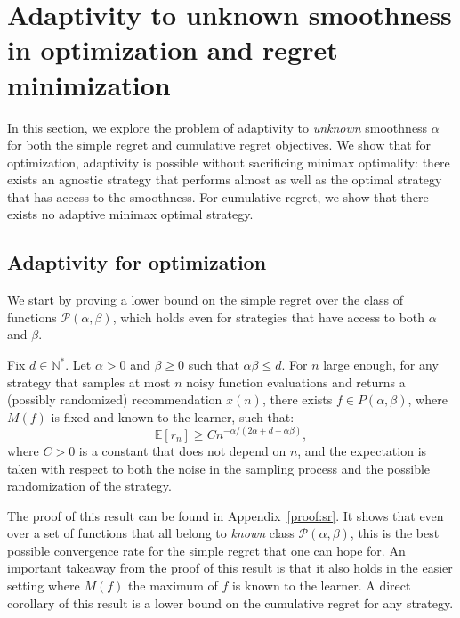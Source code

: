 \documentclass[final,12pt]{colt2018}
\newcommand{\bigO}[1]{\mathcal O\left( #1 \right)}
\begin{document}
\section{Adaptivity to unknown smoothness in optimization and regret minimization}\label{sec:adap}
In this section, we explore the problem of adaptivity to \emph{unknown} smoothness $\alpha$ for both the simple regret and cumulative regret objectives. We show that for optimization, adaptivity is possible without sacrificing minimax optimality: there exists an agnostic strategy that performs almost as well as the optimal strategy that has access to the smoothness. For cumulative regret, we show that there exists no adaptive minimax optimal strategy.

\subsection{Adaptivity for optimization}
We start by proving a lower bound on the simple regret over the class of functions $\mathcal P(\alpha, \beta)$, which holds even for strategies that have access to both $\alpha$ and $\beta$.
\begin{theorem}\label{thm:lb_sr}
Fix $d \in \mathbb N^*$. Let $\alpha > 0$ and $\beta \geq 0$ such that $\alpha\beta \leq d$. For $n$ large enough, for any strategy that samples at most $n$ noisy function evaluations and returns a (possibly randomized) recommendation $x(n)$, there exists $f \in P(\alpha, \beta)$, where $M(f)$ is fixed and known to the learner, such that:
$$
\mathbb E[r_n] \geq C n^{-\alpha/(2\alpha+d-\alpha\beta)},
$$
where $C > 0$ is a constant that does not depend on $n$, and the expectation is taken with respect to both the noise in the sampling process and the possible randomization of the strategy.
\end{theorem}

The proof of this result can be found in Appendix~\ref{proof:sr}. It shows that even over a set of functions  that all belong to \emph{known} class $\mathcal P(\alpha,\beta)$, this is the best possible convergence rate for the simple regret that one can hope for. An important takeaway from the proof of this result is that it also holds in the easier setting where $M(f)$ the maximum of $f$ is known to the learner. A direct corollary of this result is a lower bound on the cumulative regret for any strategy.
\end{document}
